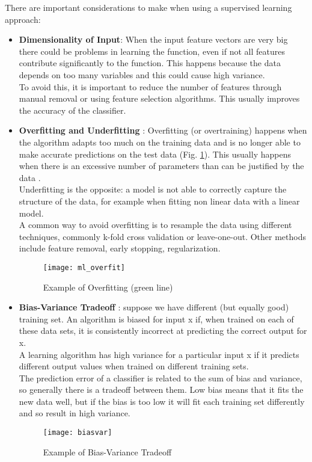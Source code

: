 There are important considerations to make when using a supervised learning approach:
\begin{itemize}
	\item \textbf{Dimensionality of Input}: When the input feature vectors are very big there could be problems in learning the function, even if not all features contribute significantly to the function. This happens because the data depends on too many variables and this could cause high variance. \\
	To avoid this, it is important to reduce the number of features through manual removal or using feature selection algorithms. This usually improves the accuracy of the classifier.
	\item \textbf{Overfitting and Underfitting} \cite{overfit}: Overfitting (or overtraining) happens when the algorithm adapts too much on the training data and is no longer able to make accurate predictions on the test data (Fig. \ref{fig:ml_overfit}). This usually happens when there is an excessive number of parameters than can be justified by the data \cite{camb_over}. \\
	Underfitting is the opposite: a model is not able to correctly capture the structure of the data, for example when fitting non linear data with a linear model. \\
	A common way to avoid overfitting is to resample the data using different techniques, commonly k-fold cross validation or leave-one-out. Other methods include feature removal, early stopping, regularization.
	
	\begin{figure}[H]
		\centering
		\texttt{[image: ml\_overfit]}
		\caption{Example of Overfitting (green line) \cite{wiki:ml_overfit}}
		\label{fig:ml_overfit}
	\end{figure}	
	
	\item \textbf{Bias-Variance Tradeoff} \cite{biasvar}: suppose we have different (but equally good) training set. An algorithm is biased for input x if, when trained on each of these data sets, it is consistently incorrect at predicting the correct output for x. \\
	A learning algorithm has high variance for a particular input x if it predicts different output values when trained on different training sets. \\
	The prediction error of a classifier is related to the sum of bias and variance, so generally there is a tradeoff between them. Low bias means that it fits the new data well, but if the bias is too low it will fit each training set differently and so result in high variance.
	\begin{figure}[H]
		\centering
		\texttt{[image: biasvar]}
		\caption{Example of Bias-Variance Tradeoff \cite{biasvarTradeoff}}
		\label{fig:biasvar}
	\end{figure}	
\end{itemize}

